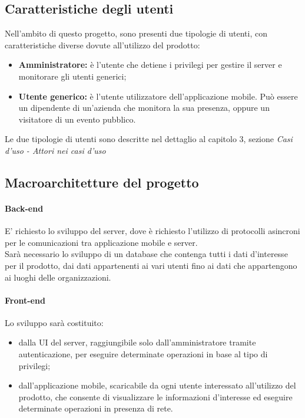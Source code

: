 \documentclass[../analisi-dei-requisiti]{subfiles}
\begin{document}
\subsection{Caratteristiche degli utenti}
\label{sub:caratteristiche_degli_utenti}
Nell'ambito di questo progetto, sono presenti due tipologie di utenti, con caratteristiche diverse dovute all'utilizzo del prodotto:
\begin{itemize}
  \item \textbf{Amministratore:} è l'utente che detiene i privilegi per gestire il server e monitorare gli utenti generici; 
  \item \textbf{Utente generico:} è l'utente utilizzatore dell'applicazione mobile. Può essere un dipendente di un'azienda che monitora la sua presenza, oppure
  un visitatore di un evento pubblico.
\end{itemize}
Le due tipologie di utenti sono descritte nel dettaglio al capitolo 3, sezione \emph{Casi d'uso - Attori nei casi d'uso}

\subsection{Macroarchitetture del progetto}
\label{sub:macroarchitetture_del_progetto}
\paragraph{Back-end}
\label{par:back-end}
E' richiesto lo sviluppo  del server, dove è richiesto l'utilizzo di protocolli asincroni per le comunicazioni tra applicazione mobile e server.\\
Sarà necessario lo sviluppo di un database che contenga tutti i dati d'interesse per il prodotto, dai dati appartenenti ai vari utenti fino ai dati che appartengono ai 
luoghi delle organizzazioni. 
\paragraph{Front-end}
\label{par:front-end}
Lo sviluppo  sarà costituito:
\begin{itemize}
  \item dalla UI del server, raggiungibile solo dall'amministratore tramite autenticazione, per eseguire determinate operazioni in base al tipo di privilegi;
  \item dall'applicazione mobile, scaricabile da ogni utente interessato all'utilizzo del prodotto, che consente di visualizzare le informazioni d'interesse ed eseguire determinate 
  operazioni in presenza di rete.
\end{itemize} 

\end{document}
